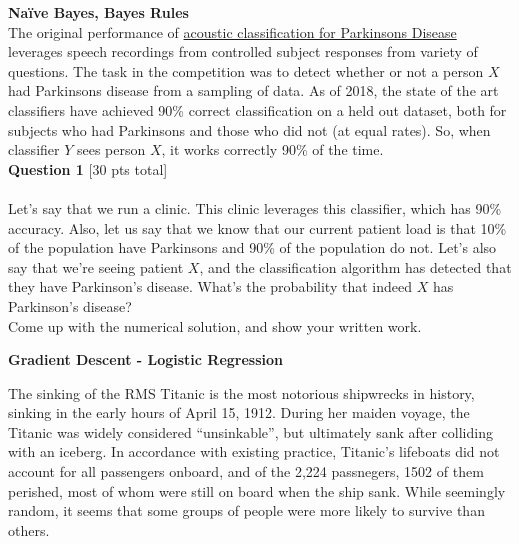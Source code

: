 \documentclass[paper=a4, fontsize=11pt]{scrartcl} %
\author{
    \textbf{YOUR NAME} \\ 
    \textbf{YOUR GIT USERNAME} \\ 
    \textbf{YOUR E-MAIL}
}%
\begin{document}
\maketitle %

{\huge \textbf{Na\"ive Bayes, Bayes Rules}} \\

The original performance of \href{https://www.ncbi.nlm.nih.gov/pmc/articles/PMC6339026/}{acoustic classification for Parkinsons Disease} leverages speech recordings from controlled subject responses from variety of questions. The task in the competition was to detect whether or not a person $X$ had Parkinsons disease from a sampling of data. As of 2018, the state of the art classifiers have achieved 90\% correct classification on a held out dataset, both for subjects who had Parkinsons and those who did not (at equal rates). So, when classifier $Y$ sees person $X$, it works correctly 90\% of the time. \\

{\Large \textbf{Question 1} [30 pts total]} \\
\\
Let's say that we run a clinic. This clinic leverages this classifier, which has 90\% accuracy. Also, let us say that we know that our current patient load is that 10\% of the population have Parkinsons and 90\% of the population do not. Let's also say that we're seeing patient $X$, and the classification algorithm has detected that they have Parkinson's disease. What's the probability that indeed $X$ has Parkinson's disease? \\

Come up with the numerical solution, and show your written work.

\vspace{1.5cm}
{\huge \textbf{Gradient Descent - Logistic Regression}}
\vspace{3mm}

The sinking of the RMS Titanic is the most notorious shipwrecks in history, sinking in the early hours of April 15, 1912. During her maiden voyage, the Titanic was widely considered “unsinkable”, but ultimately sank after colliding with an iceberg. In accordance with existing practice, Titanic's lifeboats did not account for all passengers onboard, and of the 2,224 passnegers, 1502 of them perished, most of whom were still on board when the ship sank. While seemingly random, it seems that some groups of people were more likely to survive than others. 
\end{document}
